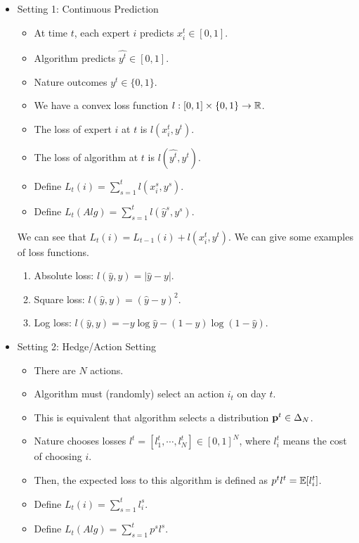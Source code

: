 \documentclass[../main.tex]{subfiles}
\begin{document}
\begin{itemize}
	\item Setting 1: Continuous Prediction
	\begin{itemize}
		\item At time $t$, each expert $i$ predicts $x_i^t \in [0,1]$.
		\item Algorithm predicts $\hat{y^t} \in [0,1]$.
		\item Nature outcomes $y^t \in \{0,1\}$.
		\item We have a convex loss function $l:[0,1] \times \{0,1\} \to \mathbb{R}$.
		\item The loss of expert $i$ at $t$ is $l(x_i^t, y^t)$.
		\item The loss of algorithm at $t$ is $l(\hat{y^t}, y^t)$.
		\item Define $L_t(i) = \sum\limits_{s = 1}^t l(x_i^s, y^s)$.
		\item Define $L_t(Alg) =\sum\limits_{s = 1}^t l(\hat{y}^s, y^s) $.
	\end{itemize}
	
	We can see that $L_t(i) = L_{t-1}(i) + l(x_i^t, y^t)$. We can give some examples of loss functions.
	\begin{enumerate}
		\item Absolute loss: $l(\hat{y} ,y) = |\hat{y} - y|$.
		\item Square loss: $l(\hat{y} ,y) = (\hat{y} - y)^2$.
		\item Log loss: $l(\hat{y}, y) = -y \log \hat{y} - (1-y) \log(1-\hat{y})$.
	\end{enumerate}
	\item Setting 2: Hedge/Action Setting
	
	\begin{itemize}
	\item There are $N$ actions.
	\item Algorithm must (randomly) select an action $i_t$ on day $t$.
	\item This is equivalent that algorithm selects a distribution $\mathbf{p}^t \in \Delta_N$.
	\item Nature chooses losses $l^t = [l_1^t,\cdots, l_N^t] \in [0,1]^N$, where $l_i^t$ means the cost of choosing $i$.
	\item Then, the expected loss to this algorithm is defined as $p^t l^t = \mathbb{E}[l_i^t]$.
	\item Define $L_t(i) = \sum\limits_{s = 1}^t l_i^s$.
	\item Define $L_t(Alg) =\sum\limits_{s = 1}^t p^s l^s $.
	\end{itemize}
\end{itemize}
\end{document}
